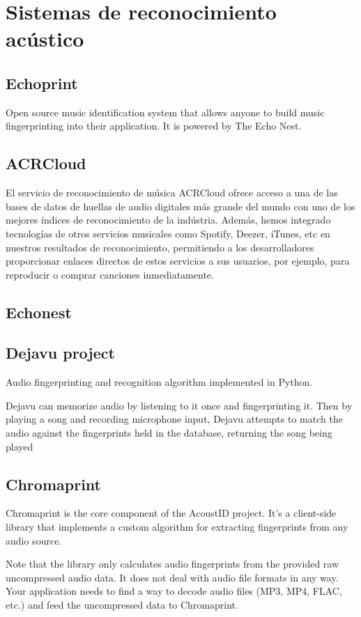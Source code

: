\section{Sistemas de reconocimiento acústico}


\subsection{Echoprint}
Open source music identification system that allows anyone to build music fingerprinting into their application. It is powered by The Echo Nest.

\subsection{ACRCloud}
El servicio de reconocimiento de música ACRCloud ofrece acceso a una de las bases de datos de huellas de audio digitales más grande del mundo con uno de los mejores índices de reconocimiento de la indústria.
Además, hemos integrado tecnologías de otros servicios musicales como Spotify, Deezer, iTunes, etc en nuestros resultados de reconocimiento, permitiendo a los desarrolladores proporcionar enlaces directos de estos servicios a sus usuarios, por ejemplo, para reproducir o comprar canciones inmediatamente.




\subsection{Echonest}
\lipsum[2-4]

\subsection{Dejavu project}
Audio fingerprinting and recognition algorithm implemented in Python.

Dejavu can memorize audio by listening to it once and fingerprinting it. Then by playing a song and recording microphone input, Dejavu attempts to match the audio against the fingerprints held in the database, returning the song being played


\subsection{Chromaprint}
Chromaprint is the core component of the AcoustID project. It's a client-side library that implements a custom algorithm for extracting fingerprints from any audio source.

Note that the library only calculates audio fingerprints from the provided raw uncompressed audio data. It does not deal with audio file formats in any way. Your application needs to find a way to decode audio files (MP3, MP4, FLAC, etc.) and feed the uncompressed data to Chromaprint.


